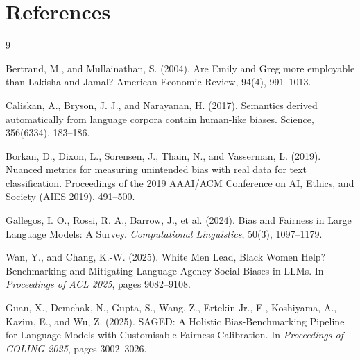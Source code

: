 \documentclass{article}
\begin{document}
\section{References}
\begin{thebibliography}{9}

Bertrand, M., and Mullainathan, S. (2004).
Are Emily and Greg more employable than Lakisha and Jamal?
American Economic Review, 94(4), 991--1013.

Caliskan, A., Bryson, J. J., and Narayanan, H. (2017).
Semantics derived automatically from language corpora contain human-like biases.
Science, 356(6334), 183--186.

Borkan, D., Dixon, L., Sorensen, J., Thain, N., and Vasserman, L. (2019).
Nuanced metrics for measuring unintended bias with real data for text classification.
Proceedings of the 2019 AAAI/ACM Conference on AI, Ethics, and Society (AIES 2019), 491--500.

Gallegos, I. O., Rossi, R. A., Barrow, J., et al. (2024).
Bias and Fairness in Large Language Models: A Survey.
\textit{Computational Linguistics}, 50(3), 1097--1179.

Wan, Y., and Chang, K.-W. (2025).
White Men Lead, Black Women Help? Benchmarking and Mitigating Language Agency Social Biases in LLMs.
In \textit{Proceedings of ACL 2025}, pages 9082--9108.

Guan, X., Demchak, N., Gupta, S., Wang, Z., Ertekin Jr., E., Koshiyama, A., Kazim, E., and Wu, Z. (2025).
SAGED: A Holistic Bias-Benchmarking Pipeline for Language Models with Customisable Fairness Calibration.
In \textit{Proceedings of COLING 2025}, pages 3002--3026.

\end{thebibliography}
\end{document}
